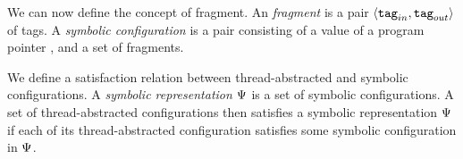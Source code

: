 We can now define the concept of fragment.
An {\em fragment} is a pair $\left\langle\mathtt{tag}_{in},\mathtt{tag}_{out}\right\rangle$ of tags.
A {\em symbolic configuration} is a pair consisting of a value of a program
pointer , and
a set of fragments.


We define
a satisfaction relation between thread-abstracted and
symbolic configurations. 
A {\em symbolic representation} $\Psi$ is a set of
symbolic configurations. 
A  set of thread-abstracted configurations then satisfies a symbolic
representation $\Psi$ if each of its thread-abstracted
configuration satisfies some symbolic configuration in $\Psi$.






